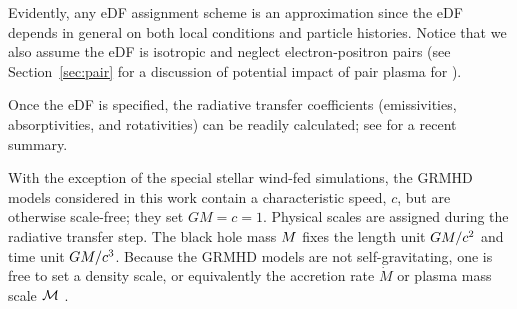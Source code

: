 Evidently, any eDF assignment scheme is an approximation since the eDF depends in general on both local conditions and particle histories.  Notice that we also assume the eDF is isotropic and neglect electron-positron pairs (see Section~\ref{sec:pair} for a discussion of potential impact of pair plasma for \sgra).

Once the eDF is specified, the radiative transfer coefficients (emissivities, absorptivities, and rotativities) can be readily calculated; see \cite{2021ApJ...921...17M} for a recent summary.



With the exception of the special stellar wind-fed simulations, the GRMHD models considered in this work contain a characteristic speed, $c$, but are otherwise scale-free; they set $GM = c = 1$.
Physical scales are assigned during the radiative transfer step.
The black hole mass $M$ fixes the length unit $GM/c^2$ and time unit $GM/c^3$.
Because the GRMHD models are not self-gravitating, one is free to set a density scale, or equivalently the accretion rate $\dot{M}$ or plasma mass scale $\mathcal{M}$ \citep[see, e.g.,][for a full discussion]{Wong_2022}.


